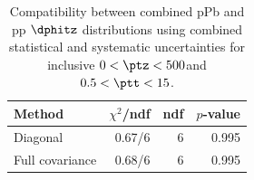 \begin{table}[htp!]
\centering
\begin{tabular}{|l|r|r|r|}
\hline
Method & $\chi^2$/ndf & ndf & $p$-value \\
\hline
Diagonal & 0.67/6 & 6 & 0.995 \\
Full covariance & 0.68/6 & 6 & 0.995 \\
\hline
\end{tabular}
\caption{Compatibility between combined pPb and pp $\dphitz$ distributions using combined statistical and systematic uncertainties for inclusive $0 < \ptz < 500$\GeV and $0.5 < \ptt < 15$\GeV.}
\label{table:chisq_dphi}
\end{table}
